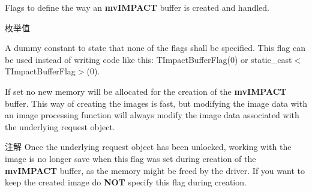 Flags to define the way an {\bfseries mv\+I\+M\+P\+A\+C\+T} buffer is created and handled. 

\begin{Desc}
\item[枚举值]\par
\begin{description}
\item[{\em 
\hypertarget{group___common_interface_gga4cd259b32d7ebe26de9437aa977dafbea9484d6d2250f03570fe420575e334c53}{ibf\+None}\label{group___common_interface_gga4cd259b32d7ebe26de9437aa977dafbea9484d6d2250f03570fe420575e334c53}
}]A dummy constant to state that none of the flags shall be specified. This flag can be used instead of writing code like this\+: T\+Impact\+Buffer\+Flag(0) or static\+\_\+cast$<$\+T\+Impact\+Buffer\+Flag$>$(0). \item[{\em 
\hypertarget{group___common_interface_gga4cd259b32d7ebe26de9437aa977dafbea592aae1da61f6a296b930f0de5518bac}{ibf\+Use\+Request\+Memory}\label{group___common_interface_gga4cd259b32d7ebe26de9437aa977dafbea592aae1da61f6a296b930f0de5518bac}
}]If set no new memory will be allocated for the creation of the {\bfseries mv\+I\+M\+P\+A\+C\+T} buffer. This way of creating the images is fast, but modifying the image data with an image processing function will always modify the image data associated with the underlying request object.

\begin{DoxyNote}{注解}
Once the underlying request object has been unlocked, working with the image is no longer save when this flag was set during creation of the {\bfseries mv\+I\+M\+P\+A\+C\+T} buffer, as the memory might be freed by the driver. If you want to keep the created image do {\bfseries N\+O\+T} specify this flag during creation.


\end{DoxyNote}
\end{description}
\end{Desc}
